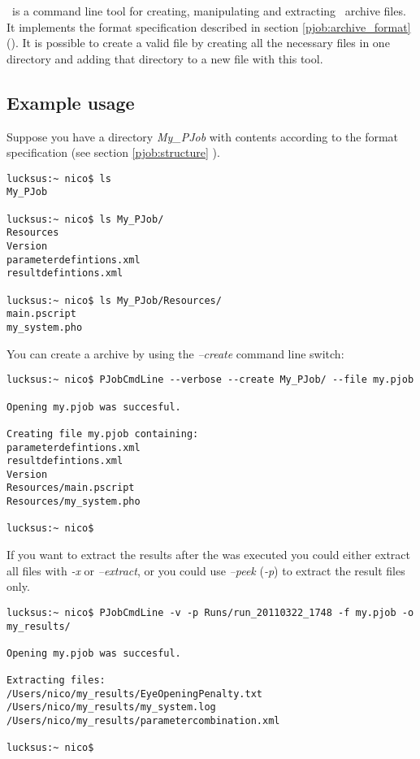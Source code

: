 \PJOBCMD\ is a command line tool for creating, manipulating and extracting \PJOB\ archive files.
It implements the format specification described in section \ref{pjob:archive_format} ().
It is possible to create a valid \PJOB{} file by creating all the necessary files in one directory
and adding that directory to a new \PJOB{} file with this tool.

\subsection{Example usage}
Suppose you have a directory \textit{My\_PJob} with contents according to the \PJOB{} format specification
(see section \ref{pjob:structure} ).
\begin{lstlisting}
lucksus:~ nico$ ls
My_PJob

lucksus:~ nico$ ls My_PJob/
Resources
Version
parameterdefintions.xml
resultdefintions.xml

lucksus:~ nico$ ls My_PJob/Resources/
main.pscript
my_system.pho
\end{lstlisting}
You can create a \PJOB{} archive by using the \textit{--create} command line switch:
\begin{lstlisting}
lucksus:~ nico$ PJobCmdLine --verbose --create My_PJob/ --file my.pjob

Opening my.pjob was succesful.

Creating file my.pjob containing:
parameterdefintions.xml
resultdefintions.xml
Version
Resources/main.pscript
Resources/my_system.pho

lucksus:~ nico$ 
\end{lstlisting}\bb

If you want to extract the results after the \PJOB{} was executed
you could either extract all files with \textit{-x} or \textit{--extract},
or you could use \textit{--peek} (\textit{-p}) to extract the result files only.
\begin{lstlisting}
lucksus:~ nico$ PJobCmdLine -v -p Runs/run_20110322_1748 -f my.pjob -o my_results/

Opening my.pjob was succesful.

Extracting files:
/Users/nico/my_results/EyeOpeningPenalty.txt
/Users/nico/my_results/my_system.log
/Users/nico/my_results/parametercombination.xml

lucksus:~ nico$
\end{lstlisting}



